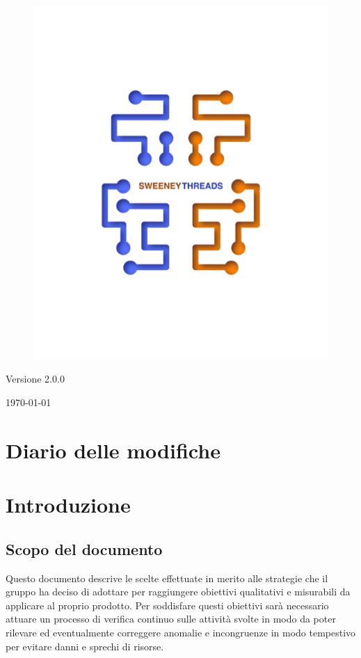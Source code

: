 \documentclass[a4paper]{article}
\begin{document}
\begin{titlepage}
		\begin{figure}[H]
			\centering
			\includegraphics[scale=0.8]{sweeney.png}
		\end{figure}
		\begin{center}
			Versione 2.0.0
		\end{center}
		{\large \today}\\[3cm] 
		\vfill  
	\end{titlepage}
	
	\tableofcontents
	\newpage
	\section*{Diario delle modifiche}
     
	\newpage
    \section{Introduzione}
		\subsection{Scopo del documento}
			Questo documento descrive le scelte effettuate in merito alle strategie 
			che il gruppo ha deciso di adottare per raggiungere obiettivi qualitativi e misurabili da 
			applicare al proprio prodotto. Per soddisfare questi obiettivi sarà necessario attuare un 
			processo di verifica continuo sulle attività svolte in modo da poter rilevare ed eventualmente 
			correggere anomalie e incongruenze in modo tempestivo per evitare danni e sprechi di risorse.
\end{document}
